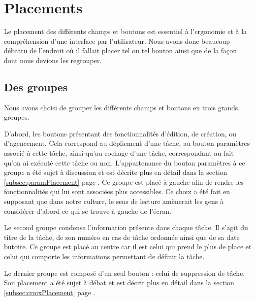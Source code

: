 \documentclass[11pt]{article}
\begin{document}
\section{Placements}

Le placement des différents champs et boutons est essentiel à
l'ergonomie et à la compréhension d'une interface par
l'utilisateur. Nous avons donc beaucoup débattu de l'endroit où il
fallait placer tel ou tel bouton ainsi que de la façon dont nous
devions les regrouper.



\subsection{Des groupes}

Nous avons choisi de grouper les différents champs et boutons en trois
grands groupes. 

D'abord, les boutons présentant des fonctionnalités
d'édition, de création, ou d'agencement. Cela correspond au dépliement
d'une tâche, au bouton paramètres associé à cette tâche, ainsi qu'au
cochage d'une tâche, correspondant au fait qu'on ai exécuté cette
tâche ou non. L'appartenance du bouton paramètres à ce groupe a été
sujet à discussion et est décrite plus en détail dans la section
\ref{subsec:paramPlacement} page \pageref{subsec:paramPlacement}. Ce
groupe est placé à gauche afin de rendre les fonctionnalités qui lui
sont associées plus accessibles. Ce choix a été fait en supposant que
dans notre culture, le sens de lecture amènerait les gens à considérer
d'abord ce qui se trouve à gauche de l'écran.

Le second groupe condense l'information présente dans chaque tâche. Il
s'agit du titre de la tâche, de son numéro en cas de tâche ordonnée
ainsi que de sa date butoire. Ce groupe est placé au centre car il est
celui qui prend le plus de place et celui qui comporte les
informations permettant de définir la tâche.

Le dernier groupe est composé d'un seul bouton : celui de suppression
de tâche. Son placement a été sujet à débat et est décrit plus en
détail dans la section \ref{subsec:croixPlacement} page
\pageref{subsec:croixPlacement}.

\end{document}

